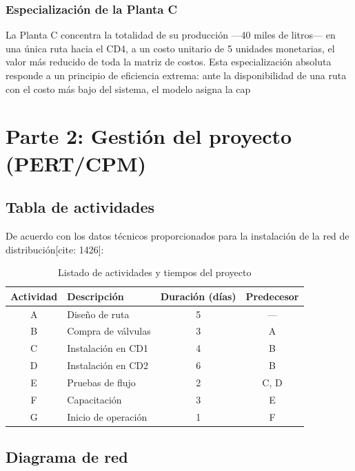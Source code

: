 \documentclass{article}
\begin{document}
\subsubsection*{Especialización de la Planta C}

La Planta C concentra la totalidad de su producción —40 miles de litros— en una única ruta hacia el CD4, a un costo unitario de 5 unidades monetarias, el valor más reducido de toda la matriz de costos. Esta especialización absoluta responde a un principio de eficiencia extrema: ante la disponibilidad de una ruta con el costo más bajo del sistema, el modelo asigna la cap

\section{Parte 2: Gestión del proyecto (PERT/CPM)}

\subsection{Tabla de actividades}

De acuerdo con los datos técnicos proporcionados para la instalación de la red de distribución[cite: 1426]:

\begin{table}[ht]
    \centering
    \begin{tabular}{|c|l|c|c|}
        \hline
        \textbf{Actividad} & \textbf{Descripción} & \textbf{Duración (días)} & \textbf{Predecesor} \\ \hline
        A & Diseño de ruta & 5 & --- \\ \hline
        B & Compra de válvulas & 3 & A \\ \hline
        C & Instalación en CD1 & 4 & B \\ \hline
        D & Instalación en CD2 & 6 & B \\ \hline
        E & Pruebas de flujo & 2 & C, D \\ \hline
        F & Capacitación & 3 & E \\ \hline
        G & Inicio de operación & 1 & F \\ \hline
    \end{tabular}
    \caption{Listado de actividades y tiempos del proyecto}
\end{table}

\subsection{Diagrama de red}
\end{document}
